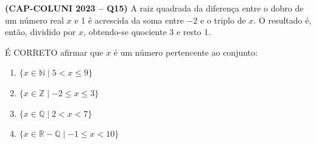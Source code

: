 \textbf{(CAP-COLUNI 2023 -- Q15)} A raiz quadrada da diferença entre o dobro de um número real $x$ e 1 é acrescida da soma entre $-2$ e o triplo de $x$. O resultado é, então, dividido por $x$, obtendo-se quociente 3 e resto 1.

É CORRETO afirmar que $x$ é um número pertencente ao conjunto:

\begin{enumerate}
	\item $\{x\in\mathbb{N}\mid 5<x\leq9\}$
	\item $\{x\in\mathbb{Z}\mid -2\leq x\leq3\}$
	\item $\{x\in\mathbb{Q}\mid 2<x<7\}$
	\item $\{x\in\mathbb{R}-\mathbb{Q}\mid -1\leq x<10\}$
\end{enumerate}

